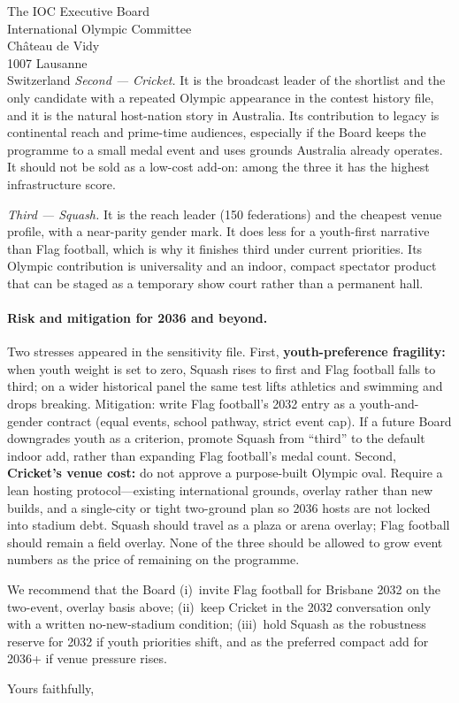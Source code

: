 \documentclass[12pt]{letter}
\begin{document}
\begin{letter}{The IOC Executive Board\\
International Olympic Committee\\
Ch\^{a}teau de Vidy\\
1007 Lausanne\\
Switzerland}
\textit{Second --- Cricket.} It is the broadcast leader of the shortlist and
the only candidate with a repeated Olympic appearance in the contest history
file, and it is the natural host-nation story in Australia. Its contribution
to legacy is continental reach and prime-time audiences, especially if the
Board keeps the programme to a small medal event and uses grounds Australia
already operates. It should not be sold as a low-cost add-on: among the three
it has the highest infrastructure score.

\textit{Third --- Squash.} It is the reach leader (150 federations) and the
cheapest venue profile, with a near-parity gender mark. It does less for a
youth-first narrative than Flag football, which is why it finishes third
under current priorities. Its Olympic contribution is universality and an
indoor, compact spectator product that can be staged as a temporary show
court rather than a permanent hall.

\paragraph{Risk and mitigation for 2036 and beyond.}
Two stresses appeared in the sensitivity file. First, \textbf{youth-preference
fragility:} when youth weight is set to zero, Squash rises to first and Flag
football falls to third; on a wider historical panel the same test lifts
athletics and swimming and drops breaking. Mitigation: write Flag football's
2032 entry as a youth-and-gender contract (equal events, school pathway,
strict event cap). If a future Board downgrades youth as a criterion, promote
Squash from ``third'' to the default indoor add, rather than expanding Flag
football's medal count. Second, \textbf{Cricket's venue cost:} do not approve
a purpose-built Olympic oval. Require a lean hosting protocol---existing
international grounds, overlay rather than new builds, and a single-city or
tight two-ground plan so 2036 hosts are not locked into stadium debt. Squash
should travel as a plaza or arena overlay; Flag football should remain a
field overlay. None of the three should be allowed to grow event numbers as
the price of remaining on the programme.

We recommend that the Board (i)~invite Flag football for Brisbane 2032 on
the two-event, overlay basis above; (ii)~keep Cricket in the 2032
conversation only with a written no-new-stadium condition; (iii)~hold Squash
as the robustness reserve for 2032 if youth priorities shift, and as the
preferred compact add for 2036+ if venue pressure rises.

\closing{Yours faithfully,}

\end{letter}
\end{document}
